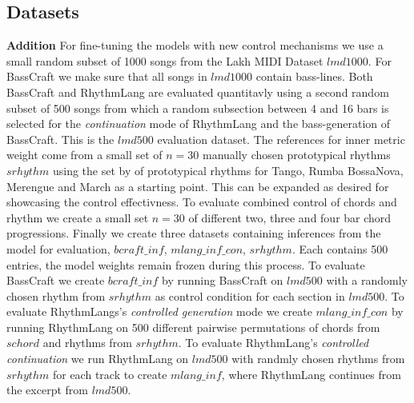 \subsection{Datasets}
\textbf{Addition} For fine-tuning the models with new control mechanisms we use a small random subset of 1000 songs from the Lakh MIDI Dataset $lmd1000$. For BassCraft we make sure that all songs in $lmd1000$ contain bass-lines. Both BassCraft and RhythmLang are evaluated quantitavly using a second random subset of 500 songs from which a random subsection between 4 and 16 bars is selected for the \textit{continuation} mode of RhythmLang and the bass-generation of BassCraft. This is the $lmd500$ evaluation dataset. The references for inner metric weight come from a small set of $n=30$ manually chosen prototypical rhythms $srhythm$ using the set by \cite{Chew_Volk_Lee_Dance_metric_weight_2005} of prototypical rhythms for Tango, Rumba BossaNova, Merengue and March as a starting point. This can be expanded as desired for showcasing the control effectivness.
To evaluate combined control of chords and rhythm we create a small set $n=30$ of different two, three and four bar chord progressions.
Finally we create three datasets containing inferences from the model for evaluation, $bcraft\_inf$,  $mlang\_inf\_con$, $srhythm$. Each contains 500 entries, the model weights remain frozen during this process.  
To evaluate BassCraft we create $bcraft\_inf$ by running BassCraft on $lmd500$ with a randomly chosen rhythm from $srhythm$ as control condition for each section in $lmd500$. 
To evaluate RhythmLangs's \textit{controlled generation} mode we create $mlang\_inf\_con$ by running RhythmLang on 500 different pairwise permutations of chords from $schord$ and rhythms from $srhythm$. 
To evaluate RhythmLang's \textit{controlled continuation} we run RhythmLang on $lmd500$ with randmly chosen rhythms from $srhythm$ for each track to create $mlang\_inf$, where RhythmLang continues from the excerpt from $lmd500$.  


